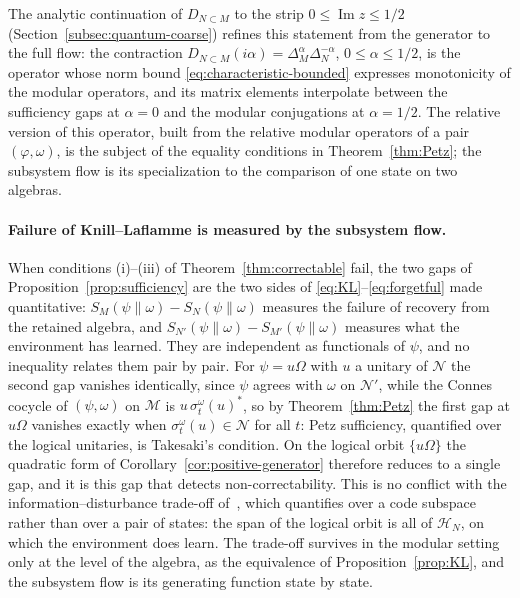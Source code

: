 \documentclass[a4paper,11pt]{article}
\theoremstyle{definition}
\begin{document}
The analytic continuation of $D_{N\subset M}$ to the strip $0\le\operatorname{Im}z\le1/2$ (Section~\ref{subsec:quantum-coarse}) refines this statement from the generator to the full flow: the contraction $D_{N\subset M}(i\alpha)=\Delta_M^{\alpha}\Delta_N^{-\alpha}$, $0\le\alpha\le1/2$, is the operator whose norm bound \eqref{eq:characteristic-bounded} expresses monotonicity of the modular operators, and its matrix elements interpolate between the sufficiency gaps at $\alpha=0$ and the modular conjugations at $\alpha=1/2$. The relative version of this operator, built from the relative modular operators of a pair $(\varphi,\omega)$, is the subject of the equality conditions in Theorem~\ref{thm:Petz}; the subsystem flow is its specialization to the comparison of one state on two algebras.


\paragraph{Failure of Knill--Laflamme is measured by the subsystem flow.}
When conditions (i)--(iii) of Theorem~\ref{thm:correctable} fail, the two gaps of Proposition~\ref{prop:sufficiency}  are the two sides of \eqref{eq:KL}--\eqref{eq:forgetful} made quantitative: $S_M(\psi\|\omega)-S_N(\psi\|\omega)$ measures the failure of recovery from the retained algebra, and $S_{N'}(\psi\|\omega)-S_{M'}(\psi\|\omega)$ measures what the environment has learned. They are independent as functionals of $\psi$, and no inequality relates them pair by pair. For $\psi=u\Omega$ with $u$ a unitary of $\mathcal N$ the second gap vanishes identically, since $\psi$ agrees with $\omega$ on $\mathcal N'$, while the Connes cocycle of $(\psi,\omega)$ on $\mathcal M$ is $u\,\sigma^\omega_t(u)^*$, so by Theorem~\ref{thm:Petz} the first gap at $u\Omega$ vanishes exactly when $\sigma^\omega_t(u)\in\mathcal N$ for all $t$: Petz sufficiency, quantified over the logical unitaries, is Takesaki's condition. On the logical orbit $\{u\Omega\}$ the quadratic form of Corollary~\ref{cor:positive-generator} therefore reduces to a single gap, and it is this gap that detects non-correctability. This is no conflict with the information--disturbance trade-off of~\cite{KretschmannSchlingemannWerner2008}, which quantifies over a code subspace rather than over a pair of states: the span of the logical orbit is all of $\mathcal H_N$, on which the environment does learn. The trade-off survives in the modular setting only at the level of the algebra, as the equivalence of Proposition~\ref{prop:KL}, and the subsystem flow is its generating function state by state.
\end{document}
